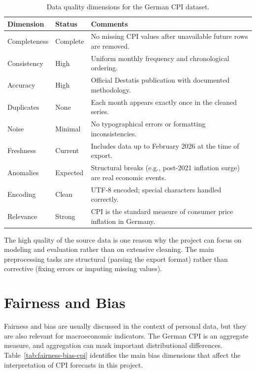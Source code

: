 \begin{table}[htbp]
	\centering
	\caption{Data quality dimensions for the German CPI dataset.}
	\label{tab:data-quality-dimensions}
	\begin{tabular}{llp{7.5cm}}
		\hline
		\textbf{Dimension} & \textbf{Status} & \textbf{Comments} \\
		\hline
		Completeness & Complete & No missing CPI values after unavailable future rows are removed. \\
		Consistency & High & Uniform monthly frequency and chronological ordering. \\
		Accuracy & High & Official Destatis publication with documented methodology. \\
		Duplicates & None & Each month appears exactly once in the cleaned series. \\
		Noise & Minimal & No typographical errors or formatting inconsistencies. \\
		Freshness & Current & Includes data up to February 2026 at the time of export. \\
		Anomalies & Expected & Structural breaks (e.g., post-2021 inflation surge) are real economic events. \\
		Encoding & Clean & UTF-8 encoded; special characters handled correctly. \\
		Relevance & Strong & CPI is the standard measure of consumer price inflation in Germany. \\
		\hline
	\end{tabular}
\end{table}

The high quality of the source data is one reason why the project can focus on modeling and evaluation rather than on extensive cleaning. The main preprocessing tasks are structural (parsing the export format) rather than corrective (fixing errors or imputing missing values).

\section{Fairness and Bias}

Fairness and bias are usually discussed in the context of personal data, but they are also relevant for macroeconomic indicators. The German CPI is an aggregate measure, and aggregation can mask important distributional differences. Table~\ref{tab:fairness-bias-cpi} identifies the main bias dimensions that affect the interpretation of CPI forecasts in this project.

